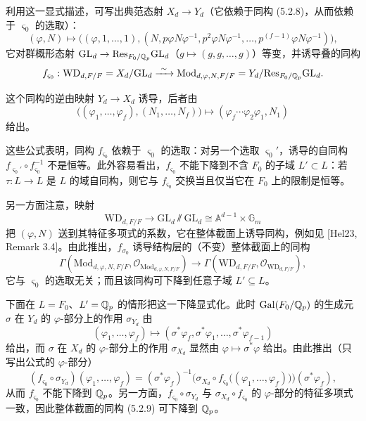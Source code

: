 利用这一显式描述，可写出典范态射 $X_d\to Y_d$（它依赖于同构 (5.2.8)，从而依赖于 $\varsigma_0$ 的选取）：
\[
(\varphi,N)\longmapsto\bigl((\varphi,1,\dots,1),(N,p\varphi N\varphi^{-1},p^2\varphi N\varphi^{-1},\dots,p^{(f-1)}\varphi N\varphi^{-1})\bigr),
\]
它对群概形态射 $\mathrm{GL}_d\to\mathrm{Res}_{F_0/\mathbb{Q}_p}\mathrm{GL}_d$（$g\mapsto(g,g,\dots,g)$）等变，并诱导叠的同构
\[
f_{\varsigma_0}: \mathrm{WD}_{d,F/F}=X_d/\mathrm{GL}_d\xrightarrow{\ \sim\ }\mathrm{Mod}_{d,\varphi,N,F/F}=Y_d/\mathrm{Res}_{F_0/\Q_p}\mathrm{GL}_d.
\]

这个同构的逆由映射 $Y_d\to X_d$ 诱导，后者由
\[
\bigl((\varphi_1,\dots,\varphi_f),(N_1,\dots,N_f)\bigr)\longmapsto(\varphi_f\cdots\varphi_2\varphi_1,N_1)
\]
给出。

这些公式表明，同构 $f_{\varsigma_0}$ 依赖于 $\varsigma_0$ 的选取：对另一个选取 $\varsigma_0'$，诱导的自同构 $f_{\varsigma_0'}\circ f_{\varsigma_0}^{-1}$ 不是恒等。此外容易看出，$f_{\varsigma_0}$ 不能下降到不含 $F_0$ 的子域 $L'\subset L$：若 $\tau:L\to L$ 是 $L$ 的域自同构，则它与 $f_{\varsigma_0}$ 交换当且仅当它在 $F_0$ 上的限制是恒等。

另一方面注意，映射
\[
\mathrm{WD}_{d,F/F}\longrightarrow\mathrm{GL}_d\sslash\mathrm{GL}_d\cong\mathbb{A}^{d-1}\times\mathbb{G}_m
\]
把 $(\varphi,N)$ 送到其特征多项式的系数，它在整体截面上诱导同构，例如见 [Hel23, Remark 3.4]。由此推出，$f_{\sigma_0}$ 诱导结构层的（不变）整体截面上的同构
\begin{equation}\tag{5.2.9}
\Gamma(\mathrm{Mod}_{d,\varphi,N,F/F},\mathcal{O}_{\mathrm{Mod}_{d,\varphi,N,F/F}})\longrightarrow\Gamma(\mathrm{WD}_{d,F/F},\mathcal{O}_{\mathrm{WD}_{d,F/F}}),
\end{equation}
它与 $\varsigma_0$ 的选取无关；而且该同构可下降到任意子域 $L'\subseteq L$。

下面在 $L=F_0$、$L'=\mathbb{Q}_p$ 的情形把这一下降显式化。此时 $\operatorname{Gal}(F_0/\mathbb{Q}_p)$ 的生成元 $\sigma$ 在 $Y_d$ 的 $\varphi$-部分上的作用 $\sigma_{Y_d}$ 由
\[
(\varphi_1,\dots,\varphi_f)\longmapsto(\sigma^*\varphi_f,\sigma^*\varphi_1,\dots,\sigma^*\varphi_{f-1})
\]
给出，而 $\sigma$ 在 $X_d$ 的 $\varphi$-部分上的作用 $\sigma_{X_d}$ 显然由 $\varphi\mapsto\sigma^*\varphi$ 给出。由此推出（只写出公式的 $\varphi$-部分）
\[
(f_{\varsigma_0}\circ\sigma_{Y_d})(\varphi_1,\dots,\varphi_f)=(\sigma^*\varphi_f)^{-1}\bigl(\sigma_{X_d}\circ f_{\varsigma_0}\bigl((\varphi_1,\dots,\varphi_f)\bigr)\bigr)(\sigma^*\varphi_f),
\]
从而 $f_{\varsigma_0}$ 不能下降到 $\mathbb{Q}_p$。另一方面，$f_{\varsigma_0}\circ\sigma_{Y_d}$ 与 $\sigma_{X_d}\circ f_{\varsigma_0}$ 的 $\varphi$-部分的特征多项式一致，因此整体截面的同构 (5.2.9) 可下降到 $\mathbb{Q}_p$。

